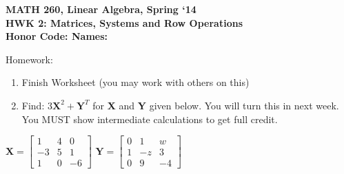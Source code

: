 \documentclass{article}
\begin{document}
\begin{flushleft}
	\bfseries{MATH 260, Linear Algebra, Spring `14}\\
	\bfseries{HWK 2:  Matrices, Systems and Row Operations}\\
	\bfseries{Honor Code:} \hspace{3.5in}\bfseries{Names:}\\
\end{flushleft}
\begin{flushleft}
\vspace{.75in}

\LARGE
Homework:
\normalsize
\begin{enumerate}
 \item Finish Worksheet (you may work with others on this)
\item Find: $3\textbf{X}^2 + \textbf{Y}^T$ for \textbf{X} and \textbf{Y} given below. You will turn this in next week. You MUST show intermediate calculations to get full credit.
\end{enumerate}

$\textbf{X}=\left[
\begin{array}{ccc}
1 & 4 & 0\\
-3 & 5 & 1\\
1 & 0 & -6
\end{array}
\right]
$
\hspace{0.1in}
$\textbf{Y}=\left[
\begin{array}{ccc}
0 & 1 & w\\
1 & -z & 3\\
0 & 9 & -4
\end{array}
\right]
$


\end{flushleft}
\end{document}

